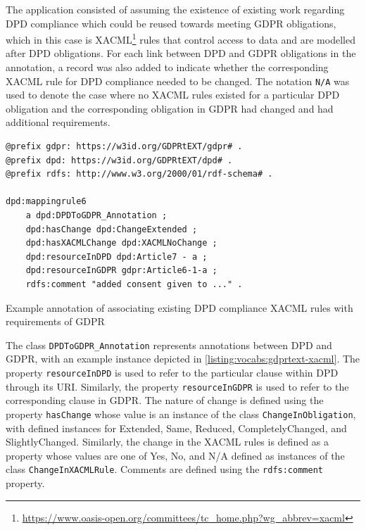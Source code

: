 The application consisted of assuming the existence of existing work regarding DPD compliance which could be reused towards meeting GDPR obligations, which in this case is XACML\footnote{\url{https://www.oasis-open.org/committees/tc_home.php?wg_abbrev=xacml}} rules that control access to data and are modelled after DPD obligations.
For each link between DPD and GDPR obligations in the annotation, a record was also added to indicate whether the corresponding XACML rule for DPD compliance needed to be changed. The notation \texttt{N/A} was used to denote the case where no XACML rules existed for a particular DPD obligation and the corresponding obligation in GDPR had changed and had additional requirements. 
\begin{listing}[htbp]
\begin{verbatim}
@prefix gdpr: https://w3id.org/GDPRtEXT/gdpr# .
@prefix dpd: https://w3id.org/GDPRtEXT/dpd# .
@prefix rdfs: http://www.w3.org/2000/01/rdf-schema# .

dpd:mappingrule6
    a dpd:DPDToGDPR_Annotation ;
    dpd:hasChange dpd:ChangeExtended ;
    dpd:hasXACMLChange dpd:XACMLNoChange ;
    dpd:resourceInDPD dpd:Article7 - a ;
    dpd:resourceInGDPR gdpr:Article6-1-a ;
    rdfs:comment "added consent given to ..." .
\end{verbatim}
\label{listing:vocabs:gdprtext-xacml}
\caption{Example annotation of associating existing DPD compliance XACML rules with requirements of GDPR}
\end{listing}

The class \texttt{DPDToGDPR\_Annotation} represents annotations between DPD and GDPR, with an example instance depicted in \autoref{listing:vocabs:gdprtext-xacml}. The property \texttt{resourceInDPD} is used to refer to the particular clause within DPD through its URI. Similarly, the property \texttt{resourceInGDPR} is used to refer to the corresponding clause in GDPR. The nature of change is defined using the property \texttt{hasChange} whose value is an instance of the class \texttt{ChangeInObligation}, with defined instances for Extended, Same, Reduced, CompletelyChanged, and SlightlyChanged. Similarly, the change in the XACML rules is defined as a property whose values are one of Yes, No, and N/A defined as instances of the class \texttt{ChangeInXACMLRule}. Comments are defined using the \texttt{rdfs:comment} property.

